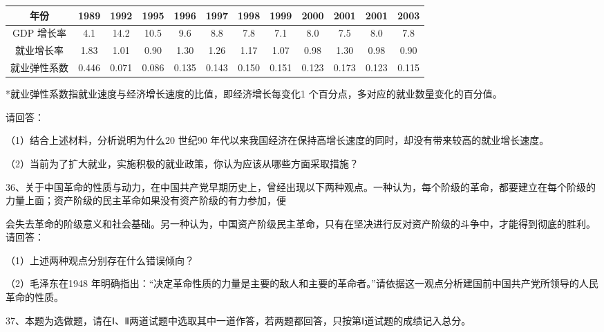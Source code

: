 \documentclass[UTF8,11pt]{ctexart}
\begin{document}
\begin{center}\begin{adjustbox}{max width=\linewidth}\begin{tabular}{|c|c|c|c|c|c|c|c|c|c|c|c|}\hline
年份 & 1989 & 1992 & 1995 & 1996 & 1997 & 1998 & 1999 & 2000 & 2001 & 2001 & 2003\\\hline
GDP 增长率 & 4.\allowbreak{}1 & 14.\allowbreak{}2 & 10.\allowbreak{}5 & 9.\allowbreak{}6 & 8.\allowbreak{}8 & 7.\allowbreak{}8 & 7.\allowbreak{}1 & 8.\allowbreak{}0 & 7.\allowbreak{}5 & 8.\allowbreak{}0 & 7.\allowbreak{}8\\\hline
就业增长率 & 1.\allowbreak{}83 & 1.\allowbreak{}01 & 0.\allowbreak{}90 & 1.\allowbreak{}30 & 1.\allowbreak{}26 & 1.\allowbreak{}17 & 1.\allowbreak{}07 & 0.\allowbreak{}98 & 1.\allowbreak{}30 & 0.\allowbreak{}98 & 0.\allowbreak{}90\\\hline
就业弹性系数 & 0.\allowbreak{}446 & 0.\allowbreak{}071 & 0.\allowbreak{}086 & 0.\allowbreak{}135 & 0.\allowbreak{}143 & 0.\allowbreak{}150 & 0.\allowbreak{}151 & 0.\allowbreak{}123 & 0.\allowbreak{}173 & 0.\allowbreak{}123 & 0.\allowbreak{}115\\\hline\end{tabular}\end{adjustbox}\end{center}

*就业弹性系数指就业速度与经济增长速度的比值，即经济增长每变化1 个百分点，多对应的就业数量变化的百分值。


请回答：


（1）结合上述材料，分析说明为什么20 世纪90 年代以来我国经济在保持高增长速度的同时，却没有带来较高的就业增长速度。


（2）当前为了扩大就业，实施积极的就业政策，你认为应该从哪些方面采取措施？


36、关于中国革命的性质与动力，在中国共产党早期历史上，曾经出现以下两种观点。一种认为，每个阶级的革命，都要建立在每个阶级的力量上面；资产阶级的民主革命如果没有资产阶级的有力参加，便


会失去革命的阶级意义和社会基础。另一种认为，中国资产阶级民主革命，只有在坚决进行反对资产阶级的斗争中，才能得到彻底的胜利。请回答：


（1）上述两种观点分别存在什么错误倾向？


（2）毛泽东在1948 年明确指出：“决定革命性质的力量是主要的敌人和主要的革命者。”请依据这一观点分析建国前中国共产党所领导的人民革命的性质。


37、本题为选做题，请在Ⅰ、Ⅱ两道试题中选取其中一道作答，若两题都回答，只按第Ⅰ道试题的成绩记入总分。
\end{document}
